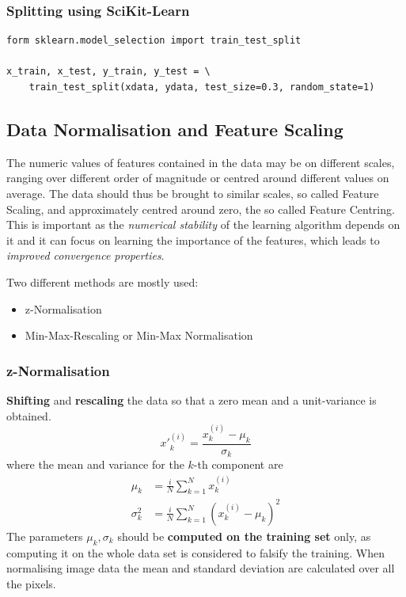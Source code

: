 \documentclass[11pt]{article}
\begin{document}
\subsubsection{Splitting using SciKit-Learn}

\begin{verbatim}
form sklearn.model_selection import train_test_split

x_train, x_test, y_train, y_test = \
	train_test_split(xdata, ydata, test_size=0.3, random_state=1)	
\end{verbatim}

\subsection{Data Normalisation and Feature Scaling}
The numeric values of features contained in the data may be on different scales, ranging over different order of magnitude or centred around different values on average. The data should thus be brought to similar scales, so called Feature Scaling, and approximately centred around zero, the so called Feature Centring. This is important as the \emph{numerical stability} of the learning algorithm depends on it and it can focus on learning the importance of the features, which leads to \emph{improved convergence properties}.

Two different methods are mostly used:
\begin{itemize}[label=-, noitemsep, nosep]
	\item z-Normalisation
	\item Min-Max-Rescaling or Min-Max Normalisation
\end{itemize}

\subsubsection{z-Normalisation}
\textbf{Shifting} and \textbf{rescaling} the data so that a zero mean and a unit-variance is obtained.
\begin{equation*}
	{x'}_k^{(i)} = \frac{x_k^{(i)}-\mu_k}{\sigma_k}
\end{equation*}
\noindent
where the mean and variance for the $k$-th component are
\begin{align*}
	\mu_k &= \frac{i}{N} \sum_{k=1}^{N}x_k^{(i)}\\
	\sigma_k^2 &= \frac{i}{N}\sum_{k=1}^{N}\left(x_k^{(i)}-\mu_k\right)^2
\end{align*}
\noindent
The parameters $\mu_k, \sigma_k$ should be \textbf{computed on the training set} only, as computing it on the whole data set is considered to falsify the training. When normalising image data the mean and standard deviation are calculated over all the pixels.
\end{document}
